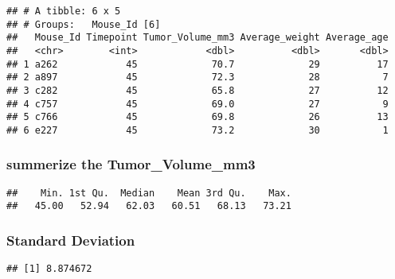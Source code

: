 \documentclass[
]{article}
\newenvironment{Shaded}{\begin{snugshade}}{\end{snugshade}}
\newcommand{\FunctionTok}[1]{\textcolor[rgb]{0.00,0.00,0.00}{#1}}
\newcommand{\NormalTok}[1]{#1}
\newcommand{\SpecialCharTok}[1]{\textcolor[rgb]{0.00,0.00,0.00}{#1}}
\begin{document}
\begin{verbatim}
## # A tibble: 6 x 5
## # Groups:   Mouse_Id [6]
##   Mouse_Id Timepoint Tumor_Volume_mm3 Average_weight Average_age
##   <chr>        <int>            <dbl>          <dbl>       <dbl>
## 1 a262            45             70.7             29          17
## 2 a897            45             72.3             28           7
## 3 c282            45             65.8             27          12
## 4 c757            45             69.0             27           9
## 5 c766            45             69.8             26          13
## 6 e227            45             73.2             30           1
\end{verbatim}

\hypertarget{summerize-the-tumor_volume_mm3-3}{%
\subsubsection{summerize the
Tumor\_Volume\_mm3}\label{summerize-the-tumor_volume_mm3-3}}

\begin{Shaded}
\end{Shaded}

\begin{verbatim}
##    Min. 1st Qu.  Median    Mean 3rd Qu.    Max. 
##   45.00   52.94   62.03   60.51   68.13   73.21
\end{verbatim}

\hypertarget{standard-deviation-3}{%
\subsubsection{Standard Deviation}\label{standard-deviation-3}}

\begin{Shaded}
\end{Shaded}

\begin{verbatim}
## [1] 8.874672
\end{verbatim}
\end{document}
